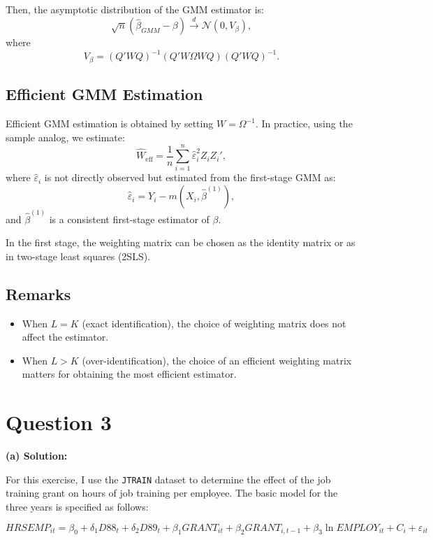 \documentclass{article}
\begin{document}
\noindent
Then, the asymptotic distribution of the GMM estimator is:
\[
\sqrt{n}(\hat{\beta}_{GMM} - \beta) \xrightarrow{d} \mathcal{N}(0, V_\beta),
\]
where 
\[
V_\beta = (Q'WQ)^{-1}(Q'W\Omega WQ)(Q'WQ)^{-1}.
\]

\subsection*{Efficient GMM Estimation}

Efficient GMM estimation is obtained by setting \( W = \Omega^{-1} \). In practice, using the sample analog, we estimate:
\[
\hat{W}_{\text{eff}} = \frac{1}{n} \sum_{i=1}^n \hat{\varepsilon}_i^2 Z_i Z_i',
\]
where \( \hat{\varepsilon}_i \) is not directly observed but estimated from the first-stage GMM as:
\[
\hat{\varepsilon}_i = Y_i - m(X_i, \hat{\beta}^{(1)}),
\]
and \( \hat{\beta}^{(1)} \) is a consistent first-stage estimator of \( \beta \).

\noindent
In the first stage, the weighting matrix can be chosen as the identity matrix or as in two-stage least squares (2SLS).

\subsection*{Remarks}

\begin{itemize}[leftmargin=1.5em]
    \item When \( L = K \) (exact identification), the choice of weighting matrix does not affect the estimator.
    \item When \( L > K \) (over-identification), the choice of an efficient weighting matrix matters for obtaining the most efficient estimator.
\end{itemize}

\section{Question 3}
\textbf{(a) Solution:}

For this exercise, I use the \texttt{JTRAIN} dataset to determine the effect of the job training grant on hours of job training per employee. The basic model for the three years is specified as follows:

\begin{equation}
HRSEMP_{it} = \beta_0 + \delta_1 D88_t + \delta_2 D89_t + \beta_1 GRANT_{it} + \beta_2 GRANT_{i,t-1} + \beta_3 \ln EMPLOY_{it} + C_i + \varepsilon_{it}
\end{equation}
\end{document}
